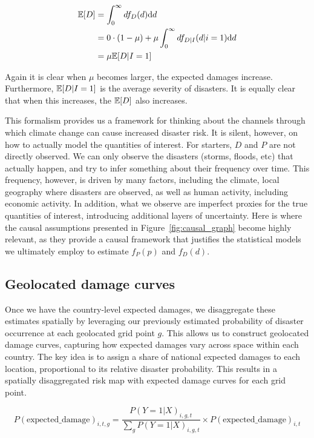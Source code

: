\begin{align}
\mathbb{E}[D] &= \int_0^\infty d f_D(d) \mathrm{d} d \\
&= 0 \cdot (1 - \mu) + \mu \int_0^\infty d f_{D|I}(d|i = 1) \mathrm{d} d \\
&= \mu \mathbb{E}[D|I = 1]
\end{align}

Again it is clear when $\mu$ becomes larger, the expected damages increase. Furthermore, $\mathbb{E}[D|I = 1]$ is the average severity of disasters. It is equally clear that when this increases, the $\mathbb{E}[D]$ also increases.

This formalism provides us a framework for thinking about the channels through which climate change can cause increased disaster risk. It is silent, however, on how to actually model the quantities of interest. For starters, $D$ and $P$ are not directly observed. We can only observe the disasters (storms, floods, etc) that actually happen, and try to infer something about their frequency over time. This frequency, however, is driven by many factors, including the climate, local geography where disasters are observed, as well as human activity, including economic activity. In addition, what we observe are imperfect proxies for the true quantities of interest, introducing additional layers of uncertainty. Here is where the causal assumptions presented in Figure~\ref{fig:causal_graph} become highly relevant, as they provide a causal framework that justifies the statistical models we ultimately employ to estimate $f_P(p)$ and $f_D(d)$.

\FloatBarrier
\subsection{Geolocated damage curves}

Once we have the country-level expected damages, we disaggregate these estimates spatially by leveraging our previously estimated probability of disaster occurrence at each geolocated grid point $g$. This allows us to construct geolocated damage curves, capturing how expected damages vary across space within each country. The key idea is to assign a share of national expected damages to each location, proportional to its relative disaster probability. This results in a spatially disaggregated risk map with expected damage curves for each grid point.

\begin{equation}
P(\text{expected\_damage})_{i,t,g} = \frac{P(Y=1|X)_{i,g,t}}{\sum_g P(Y=1|X)_{i,g,t}} \times P(\text{expected\_damage})_{i,t}
\end{equation}

